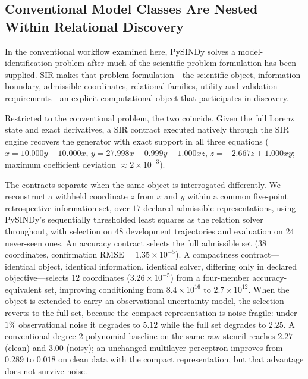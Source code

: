 
\subsection{Conventional Model Classes Are Nested Within Relational Discovery}
\label{sec:task-conditioning}

In the conventional workflow examined here, PySINDy solves a model-identification
problem after much of the scientific problem formulation has been supplied. SIR
makes that problem formulation---the scientific object, information boundary,
admissible coordinates, relational families, utility and validation
requirements---an explicit computational object that participates in discovery.

Restricted to the conventional problem, the two coincide. Given the full Lorenz
state and exact derivatives, a SIR contract executed natively through the SIR
engine recovers the generator with exact support in all three equations
($\dot x=10.000y-10.000x$, $\dot y=27.998x-0.999y-1.000xz$,
$\dot z=-2.667z+1.000xy$; maximum coefficient deviation $\approx2\times10^{-3}$).

The contracts separate when the same object is interrogated differently. We
reconstruct a withheld coordinate $z$ from $x$ and $y$ within a common
five-point retrospective information set, over $17$ declared admissible
representations, using PySINDy's sequentially thresholded least squares as the
relation solver throughout, with selection on $48$ development trajectories and
evaluation on $24$ never-seen ones. An accuracy contract selects the full
admissible set ($38$ coordinates, confirmation $\mathrm{RMSE}=1.35\times10^{-5}$).
A compactness contract---identical object, identical information, identical
solver, differing only in declared objective---selects $12$ coordinates
($3.26\times10^{-5}$) from a four-member accuracy-equivalent set, improving
conditioning from $8.4\times10^{16}$ to $2.7\times10^{12}$. When the object is
extended to carry an observational-uncertainty model, the selection reverts to
the full set, because the compact representation is noise-fragile: under $1\%$
observational noise it degrades to $5.12$ while the full set degrades to $2.25$.
A conventional degree-2 polynomial baseline on the same raw stencil reaches
$2.27$ (clean) and $3.00$ (noisy); an unchanged multilayer perceptron improves
from $0.289$ to $0.018$ on clean data with the compact representation, but that
advantage does not survive noise.

